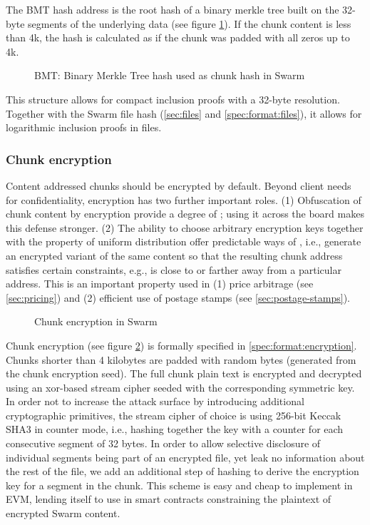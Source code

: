 The BMT hash address is the root hash of a binary merkle tree built on the  32-byte segments of the underlying data (see figure \ref{fig:BMT}). If the chunk content is less  than 4k, the hash is calculated as if the chunk was padded with all zeros up to 4k. 



\begin{figure}[htbp]
   \centering
   
   \caption[BMT: Binary Merkle Tree hash used as chunk hash in Swarm]{BMT: Binary Merkle Tree hash used as chunk hash in Swarm}
   \label{fig:BMT}
\end{figure}

This structure  allows for compact inclusion proofs with a 32-byte resolution. Together with the Swarm file hash (\ref{sec:files} and \ref{spec:format:files}), it allows for logarithmic inclusion proofs in files. 

\subsubsection{Chunk encryption}\label{sec:chunk-encryption}

Content addressed chunks should be encrypted by default. Beyond client needs for confidentiality, encryption has two further important roles. (1) Obfuscation of chunk content by encryption  provide a degree of ; using it across the board makes this defense stronger. (2) The ability to choose arbitrary encryption keys together with the property of uniform distribution offer predictable ways of , i.e., generate an encrypted variant of the same content so that the resulting chunk address satisfies certain constraints, e.g., is close to or farther away from a particular address. This is an important property used in (1) price arbitrage (see \ref{sec:pricing}) and (2) efficient use of postage stamps (see \ref{sec:postage-stamps}).


\begin{figure}[htbp]
   \centering
   \caption[Chunk encryption in Swarm]{Chunk encryption in Swarm}
   \label{fig:chunk-encryption}
\end{figure}


Chunk encryption (see figure \ref{fig:chunk-encryption}) is formally specified in \ref{spec:format:encryption}. Chunks shorter than 4 kilobytes are padded with random bytes (generated from the chunk encryption seed). The full chunk plain text is encrypted and decrypted using an xor-based stream cipher seeded with the corresponding symmetric key. In order not to increase the attack surface by introducing additional cryptographic primitives, the stream cipher of choice is using 256-bit Keccak SHA3 in counter mode, i.e., hashing together the key with a counter for each consecutive segment of 32 bytes. In order to allow selective disclosure of individual segments being part of an encrypted file, yet leak no information about the rest of the file, we add an additional step of hashing to  derive the encryption key for a segment in the chunk. This scheme is easy and cheap to implement in EVM, lending itself to use in smart contracts constraining the plaintext of encrypted Swarm content. 

